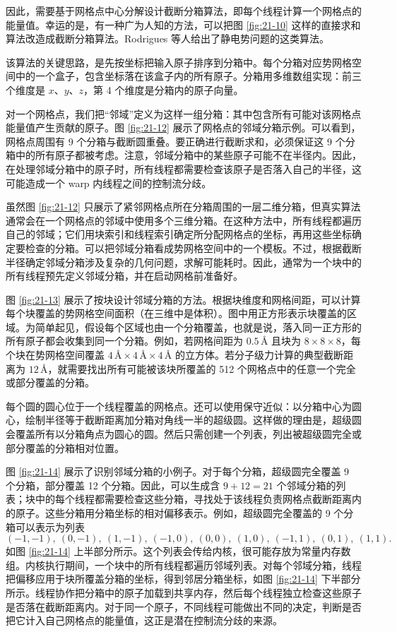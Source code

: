 因此，需要基于网格点中心分解设计截断分箱算法，即每个线程计算一个网格点的能量值。幸运的是，有一种广为人知的方法，可以把图 \ref{fig:21-10} 这样的直接求和算法改造成截断分箱算法。Rodrigues 等人给出了静电势问题的这类算法\cite{ch21-rodrigues2008cutoff}。

该算法的关键思路，是先按坐标把输入原子排序到分箱中。每个分箱对应势网格空间中的一个盒子，包含坐标落在该盒子内的所有原子。分箱用多维数组实现：前三个维度是 $x$、$y$、$z$，第 4 个维度是分箱内的原子向量。

对一个网格点，我们把“邻域”定义为这样一组分箱：其中包含所有可能对该网格点能量值产生贡献的原子。图 \ref{fig:21-12} 展示了网格点的邻域分箱示例。可以看到，网格点周围有 9 个分箱与截断圆重叠。要正确进行截断求和，必须保证这 9 个分箱中的所有原子都被考虑。注意，邻域分箱中的某些原子可能不在半径内。因此，在处理邻域分箱中的原子时，所有线程都需要检查该原子是否落入自己的半径，这可能造成一个 warp 内线程之间的控制流分歧。

虽然图 \ref{fig:21-12} 只展示了紧邻网格点所在分箱周围的一层二维分箱，但真实算法通常会在一个网格点的邻域中使用多个三维分箱。在这种方法中，所有线程都遍历自己的邻域；它们用块索引和线程索引确定所分配网格点的坐标，再用这些坐标确定要检查的分箱。可以把邻域分箱看成势网格空间中的一个模板。不过，根据截断半径确定邻域分箱涉及复杂的几何问题，求解可能耗时。因此，通常为一个块中的所有线程预先定义邻域分箱，并在启动网格前准备好。

图 \ref{fig:21-13} 展示了按块设计邻域分箱的方法。根据块维度和网格间距，可以计算每个块覆盖的势网格空间面积（在三维中是体积）。图中用正方形表示块覆盖的区域。为简单起见，假设每个区域也由一个分箱覆盖，也就是说，落入同一正方形的所有原子都会收集到同一个分箱。例如，若网格间距为 $0.5\,\text{\AA}$ 且块为 $8\times8\times8$，每个块在势网格空间覆盖 $4\,\text{\AA}\times4\,\text{\AA}\times4\,\text{\AA}$ 的立方体。若分子级力计算的典型截断距离为 $12\,\text{\AA}$，就需要找出所有可能被该块所覆盖的 512 个网格点中的任意一个完全或部分覆盖的分箱。

每个圆的圆心位于一个线程覆盖的网格点。还可以使用保守近似：以分箱中心为圆心，绘制半径等于截断距离加分箱对角线一半的超级圆。这样做的理由是，超级圆会覆盖所有以分箱角点为圆心的圆。然后只需创建一个列表，列出被超级圆完全或部分覆盖的分箱相对位置。

图 \ref{fig:21-14} 展示了识别邻域分箱的小例子。对于每个分箱，超级圆完全覆盖 9 个分箱，部分覆盖 12 个分箱。因此，可以生成含 $9+12=21$ 个邻域分箱的列表；块中的每个线程都需要检查这些分箱，寻找处于该线程负责网格点截断距离内的原子。这些分箱用分箱坐标的相对偏移表示。例如，超级圆完全覆盖的 9 个分箱可以表示为列表
\[
(-1,-1),\ (0,-1),\ (1,-1),\ (-1,0),\ (0,0),\ (1,0),\ (-1,1),\ (0,1),\ (1,1).
\]
如图 \ref{fig:21-14} 上半部分所示。这个列表会传给内核，很可能存放为常量内存数组。内核执行期间，一个块中的所有线程都遍历邻域列表。对每个邻域分箱，线程把偏移应用于块所覆盖分箱的坐标，得到邻居分箱坐标，如图 \ref{fig:21-14} 下半部分所示。线程协作把分箱中的原子加载到共享内存，然后每个线程独立检查这些原子是否落在截断距离内。对于同一个原子，不同线程可能做出不同的决定，判断是否把它计入自己网格点的能量值，这正是潜在控制流分歧的来源。


